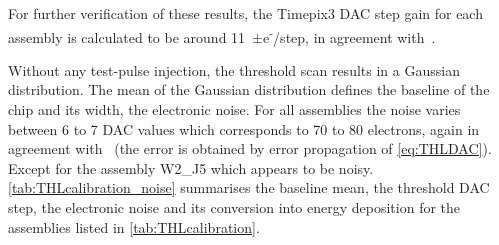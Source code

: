 For further verification of these results, the Timepix3 DAC step gain
for each assembly is calculated to be around
11~$\pm$e\textsuperscript{-}/step, in agreement
with~\cite{Timepix3Poikela}. 

Without any test-pulse injection, the threshold scan results in a
Gaussian distribution. The mean of the Gaussian distribution defines
the baseline of the chip and its width, the electronic noise. For all
assemblies the noise varies between 6 to 7 DAC values which
corresponds to 70 to 80 electrons, again in agreement
with~\cite{art:tmpx} (the error is obtained by error propagation of
\cref{eq:THLDAC}). Except for the assembly W2\_J5 which appears to be
noisy. \cref{tab:THLcalibration_noise} summarises the baseline mean,
the threshold DAC step, the electronic noise and its conversion into
energy deposition for the assemblies listed in
\cref{tab:THLcalibration}.



\begin{table}[htbp]
  \centering
  \caption{Measured baseline mean, threshold DAC step gain, the electronic noise
    and its conversion into energy deposition.}
  \label{tab:THLcalibration_noise}
\end{table}


